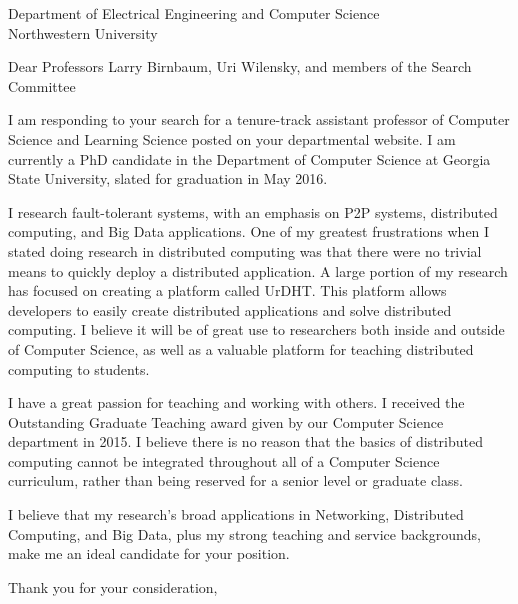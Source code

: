 \documentclass{letter}
\date{}
\begin{document}
 
\begin{letter}{Department of Electrical Engineering and Computer Science \\ Northwestern University} 
\opening{Dear Professors Larry Birnbaum, Uri Wilensky, and members of the Search Committee} 
 
I am responding to your search for a tenure-track assistant professor of Computer Science and Learning Science posted on your departmental website.
I am currently a PhD candidate in the Department of Computer Science at Georgia State University, slated for graduation in May 2016.

I research fault-tolerant systems, with an emphasis on P2P systems, distributed computing, and Big Data applications.
One of my greatest frustrations when I stated doing research in distributed computing was that there were no trivial means to quickly deploy a distributed application.
A large portion of my research has focused on creating a platform called UrDHT.
This platform allows developers to easily create distributed applications and solve distributed computing.
I believe it will be of great use to researchers both inside and outside of Computer Science, as well as a valuable platform for teaching distributed computing to students.



I have a great passion for teaching and working with others.
I received the Outstanding Graduate Teaching award given by our Computer Science department in 2015.
I believe there is no reason that the basics of distributed computing cannot be integrated throughout all of a Computer Science curriculum, rather than being  reserved for a senior level or graduate class.

I believe that my research's broad applications in Networking, Distributed Computing, and Big Data, plus my strong teaching and service backgrounds, make me an ideal candidate for your position.


\closing{Thank you for your consideration,} 
\end{letter} 
\end{document}
